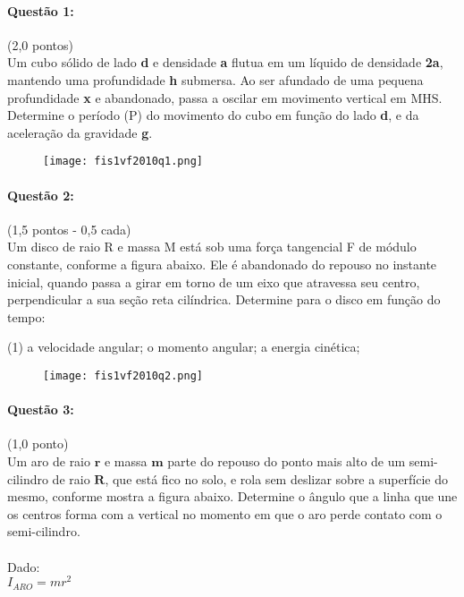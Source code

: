 \documentclass[12pt,a4paper]{article}
\begin{document}
\paragraph{Questão 1:}(2,0 pontos)\\
Um cubo sólido de lado \textbf{d} e densidade \textbf{a} flutua em um líquido de densidade \textbf{2a},  mantendo uma profundidade \textbf{h} submersa. Ao ser afundado de uma pequena profundidade \textbf{x} e abandonado, passa a oscilar em movimento vertical em MHS.  Determine o período (P) do movimento do cubo em função do lado \textbf{d},  e da aceleração da gravidade \textbf{g}. 

\begin{figure}[h]
\centering
\texttt{[image: fis1vf2010q1.png]}
\end{figure}

\paragraph{Questão 2:}(1,5 pontos - 0,5 cada)\\
Um disco de raio R e massa M está sob uma força tangencial F de módulo constante,  conforme a figura abaixo. Ele é abandonado do repouso no instante inicial,  quando passa a girar em torno de um eixo que atravessa seu centro,  perpendicular a sua seção reta cilíndrica.  Determine para o disco em função do tempo:

\begin{tasks}(1)
\task a velocidade angular;
\task o momento angular;
\task a energia cinética;
\end{tasks}

\begin{figure}[h]
\centering
\texttt{[image: fis1vf2010q2.png]}
\end{figure}

\paragraph{Questão 3:}(1,0 ponto)\\
Um aro de raio $\textbf{r}$ e massa $\textbf{m}$ parte do repouso do ponto mais alto de um semi-cilindro de raio $\textbf{R}$, que está fico no solo, e rola sem deslizar sobre a superfície do mesmo, conforme mostra a figura abaixo. Determine o ângulo que a linha que une os centros forma com a vertical no momento em que o aro perde contato com o semi-cilindro.\\
\\
Dado:\\
$I_{ARO}=mr^2$
\end{document}
